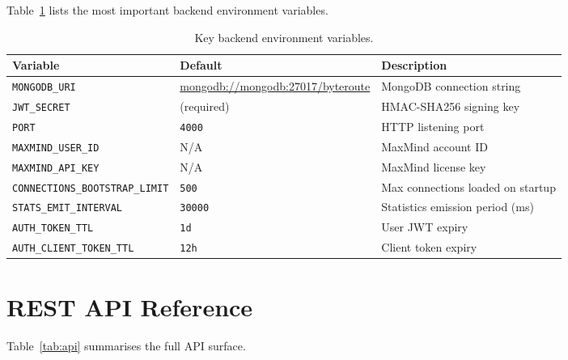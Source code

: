 \documentclass[12pt]{report}
\begin{document}
Table~\ref{tab:env} lists the most important backend environment variables.

\begin{table}[H]
\centering
\small
\begin{tabularx}{\textwidth}{l p{} X}
\toprule
\textbf{Variable} & \textbf{Default} & \textbf{Description} \\
\midrule
\texttt{MONGODB\_URI}                  & \url{mongodb://mongodb:27017/byteroute} & MongoDB connection string \\
\texttt{JWT\_SECRET}                   & (required)   & HMAC-SHA256 signing key \\
\texttt{PORT}                          & \texttt{4000} & HTTP listening port \\
\texttt{MAXMIND\_USER\_ID}             & N/A          & MaxMind account ID \\
\texttt{MAXMIND\_API\_KEY}             & N/A          & MaxMind license key \\
\texttt{CONNECTIONS\_BOOTSTRAP\_LIMIT} & \texttt{500} & Max connections loaded on startup \\
\texttt{STATS\_EMIT\_INTERVAL}         & \texttt{30000} & Statistics emission period (ms) \\
\texttt{AUTH\_TOKEN\_TTL}              & \texttt{1d}  & User JWT expiry \\
\texttt{AUTH\_CLIENT\_TOKEN\_TTL}      & \texttt{12h} & Client token expiry \\
\bottomrule
\end{tabularx}
\caption{Key backend environment variables.}
\label{tab:env}
\end{table}

\newpage
\section{REST API Reference}
Table~\ref{tab:api} summarises the full API surface.
\end{document}
